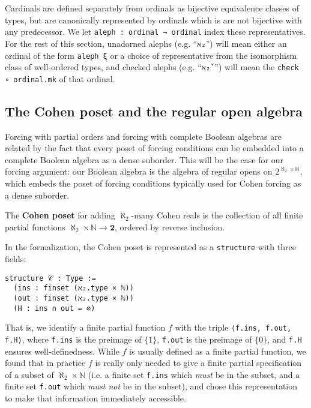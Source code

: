 \documentclass[a4paper,USenglish,cleveref, autoref]{lipics-v2019}
\newcommand{\lil}{\lstinline}
\begin{document}
Cardinals are defined separately from ordinals as bijective equivalence classes of types, but are canonically represented by ordinals which is are not bijective with any predecessor. We let \lil{aleph : ordinal → ordinal} index these representatives. For the rest of this section, unadorned alephs (e.g. ``\lil{ℵ₂}'') will mean either an ordinal of the form \lil{aleph ξ} or a choice of representative from the isomorphism class of well-ordered types, and checked alephs (e.g. ``\lil{ℵ₂̌ }'') will mean the \lil{check ∘ ordinal.mk} of that ordinal.

\subsection{The Cohen poset and the regular open algebra}
Forcing with partial orders and forcing with complete Boolean algebras are related by the fact that every poset of forcing conditions can be embedded into a complete Boolean algebra as a dense suborder. This will be the case for our forcing argument: our Boolean algebra is the algebra of regular opens on $2^{\aleph_2 \times \mathbb{N}}$, which embeds the poset of forcing conditions typically used for Cohen forcing as a dense suborder.
\begin{definition}
  The \textbf{Cohen poset} for adding $\aleph_2$-many Cohen reals is the collection of all finite partial functions $\aleph_2 \times \mathbb{N} \to \mathbf{2}$, ordered by reverse inclusion.
\end{definition}

In the formalization, the Cohen poset is represented as a \lstinline{structure} with three fields:
\begin{lstlisting}
structure 𝒞 : Type :=
  (ins : finset (ℵ₂.type × ℕ))
  (out : finset (ℵ₂.type × ℕ))
  (H : ins ∩ out = ∅)
\end{lstlisting}

That is, we identify a finite partial function $f$ with the triple \lil{⟨f.ins, f.out, f.H⟩}, where \lil{f.ins} is the preimage of $\{1\}$, \lil{f.out} is the preimage of $\{0\}$, and \lil{f.H} ensures well-definedness. While $f$ is usually defined as a finite partial function, we found that in practice $f$ is really only needed to give a finite partial specification of a subset of $\aleph_2 \times \mathbb{N}$ (i.e. a finite set \lil{f.ins} which \emph{must} be in the subset, and a finite set \lil{f.out} which \emph{must not} be in the subset), and chose this representation to make that information immediately accessible.
\end{document}
